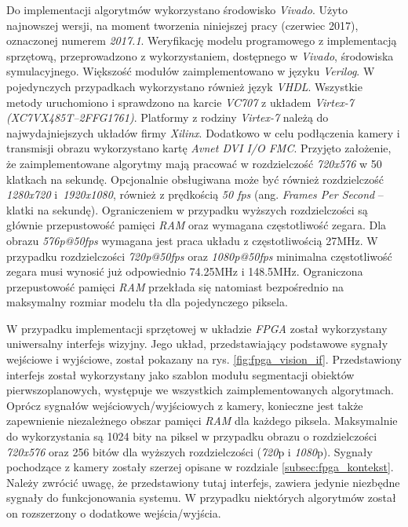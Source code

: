 Do implementacji algorytmów wykorzystano środowisko \textit{Vivado}. 
Użyto najnowszej wersji, na moment tworzenia niniejszej pracy (czerwiec 2017), oznaczonej numerem \textit{2017.1}. Weryfikację modelu programowego z implementacją sprzętową, przeprowadzono z wykorzystaniem, dostępnego w \textit{Vivado}, środowiska symulacyjnego.
Większość modułów zaimplementowano w języku \textit{Verilog}. 
W pojedynczych przypadkach wykorzystano również język \textit{VHDL}. 
Wszystkie metody uruchomiono i sprawdzono na karcie \textit{VC707} z układem \textit{Virtex-7 (\small{XC7VX485T--2FFG1761})}. Platformy z rodziny \textit{Virtex-7} należą do najwydajniejszych układów firmy \textit{Xilinx}. %
Dodatkowo w celu podłączenia kamery i transmisji obrazu wykorzystano kartę \textit{Avnet DVI I/O FMC}. 
Przyjęto założenie, że zaimplementowane algorytmy mają pracować w rozdzielczość \textit{720x576} w 50 klatkach na sekundę. Opcjonalnie obsługiwana może być również rozdzielczość \textit{1280x720} i~\textit{1920x1080}, również z prędkością \textit{50 fps} (ang. \textit{Frames Per Second} -- klatki na sekundę). Ograniczeniem w przypadku wyższych rozdzielczości są głównie przepustowość pamięci \textit{RAM} oraz wymagana częstotliwość zegara. Dla obrazu \textit{576p@50fps} wymagana jest praca układu z częstotliwością \num{27}MHz. W przypadku rozdzielczości \textit{720p@50fps} oraz \textit{1080p@50fps} minimalna częstotliwość zegara musi wynosić już odpowiednio \num{74.25}MHz i \num{148.5}MHz. Ograniczona przepustowość pamięci \textit{RAM} przekłada się natomiast bezpośrednio na maksymalny rozmiar modelu tła dla pojedynczego piksela.

W przypadku implementacji sprzętowej w układzie \textit{FPGA} został wykorzystany uniwersalny interfejs wizyjny. 
Jego układ, przedstawiający podstawowe sygnały wejściowe i wyjściowe, został pokazany na rys. \ref{fig:fpga_vision_if}. Przedstawiony interfejs został wykorzystany jako szablon modułu segmentacji obiektów pierwszoplanowych, występuje we wszystkich zaimplementowanych algorytmach. 
Oprócz sygnałów wejściowych/wyjściowych z kamery, konieczne jest także zapewnienie niezależnego obszar pamięci \textit{RAM} dla każdego piksela.
Maksymalnie do wykorzystania są 1024 bity na piksel w przypadku obrazu o rozdzielczości \textit{720x576} oraz 256 bitów dla wyższych rozdzielczości (\textit{720}p i \textit{1080}p). 
Sygnały pochodzące z kamery zostały szerzej opisane w rozdziale \ref{subsec:fpga_kontekst}. 
Należy zwrócić uwagę, że przedstawiony tutaj interfejs, zawiera jedynie niezbędne sygnały do funkcjonowania systemu. 
W przypadku niektórych algorytmów został on rozszerzony o dodatkowe wejścia/wyjścia. 

